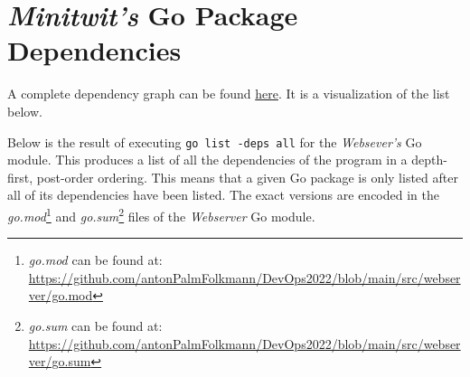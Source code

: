 \section{\textit{Minitwit's} Go Package Dependencies}
\label{app:go-pkg-deps}

A complete dependency graph can be found \href{https://raw.githubusercontent.com/antonPalmFolkmann/DevOps2022/main/report/images/full-dep.jpg}{here}.
It is a visualization of the list below.

Below is the result of executing \texttt{go list -deps all} for the \textit{Websever's} Go module.
This produces a list of all the dependencies of the program in a depth-first, post-order ordering.
This means that a given Go package is only listed after all of its dependencies have been listed.
The exact versions are encoded in the \textit{go.mod}\footnote{\textit{go.mod} can be found at: \url{https://github.com/antonPalmFolkmann/DevOps2022/blob/main/src/webserver/go.mod}} and \textit{go.sum}\footnote{\textit{go.sum} can be found at: \url{https://github.com/antonPalmFolkmann/DevOps2022/blob/main/src/webserver/go.sum}} files of the \textit{Webserver} Go module.


